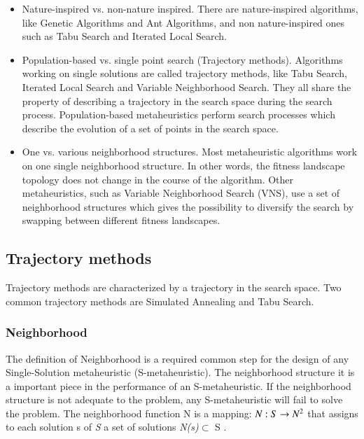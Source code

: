 \documentclass{report}
\begin{document}
\begin{itemize}
\item Nature-inspired vs. non-nature inspired. There are nature-inspired algorithms, like Genetic Algorithms and Ant Algorithms, and non nature-inspired ones such as Tabu Search and Iterated Local Search. 

\item Population-based vs. single point search (Trajectory methods). Algorithms working on single solutions are called trajectory methods, like Tabu Search, Iterated Local Search and Variable Neighborhood Search. They all share the property of describing a trajectory in the search space during the search process. Population-based metaheuristics perform search processes which describe the evolution of a set of points in the search space.

\item One vs. various neighborhood structures. Most metaheuristic algorithms work on one single neighborhood structure. In other words, the fitness landscape topology does not change in the course of the algorithm. Other metaheuristics, such as Variable Neighborhood Search (VNS), use a set of neighborhood structures which gives the possibility to diversify the search by swapping between different fitness
landscapes.


\end{itemize}

\subsection{Trajectory methods}

Trajectory methods are characterized by a trajectory in the search space. Two common trajectory methods are Simulated Annealing and Tabu Search.

\subsubsection{Neighborhood}

The definition of Neighborhood is a required common step for the design of any Single-Solution metaheuristic (S-metaheuristic). The neighborhood structure it is a important piece in the performance of an S-metaheuristic. If the neighborhood structure is not adequate to the problem,
any S-metaheuristic will fail to solve the problem. The neighborhood function N is a mapping: $ N : S \rightarrow N\textsuperscript{2} $ that assigns to each solution s of \textit{S} a set of solutions \textit{N(s)}$\subset$ S \cite{Talbi2013}.
\end{document}

